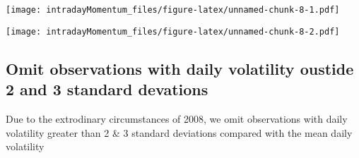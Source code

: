 \documentclass[]{article}
\newenvironment{Shaded}{\begin{snugshade}}{\end{snugshade}}
\newcommand{\KeywordTok}[1]{\textcolor[rgb]{0.13,0.29,0.53}{\textbf{#1}}}
\newcommand{\NormalTok}[1]{#1}
\newcommand{\OperatorTok}[1]{\textcolor[rgb]{0.81,0.36,0.00}{\textbf{#1}}}
\newcommand{\StringTok}[1]{\textcolor[rgb]{0.31,0.60,0.02}{#1}}
\begin{document}
\texttt{[image: intradayMomentum\_files/figure-latex/unnamed-chunk-8-1.pdf]}

\begin{Shaded}
\end{Shaded}

\texttt{[image: intradayMomentum\_files/figure-latex/unnamed-chunk-8-2.pdf]}

\hypertarget{omit-observations-with-daily-volatility-oustide-2-and-3-standard-devations}{%
\subsection{Omit observations with daily volatility oustide 2 and 3
standard
devations}\label{omit-observations-with-daily-volatility-oustide-2-and-3-standard-devations}}

Due to the extrodinary circumstances of 2008, we omit observations with
daily volatility greater than 2 \& 3 standard deviations compared with
the mean daily volatility
\end{document}
